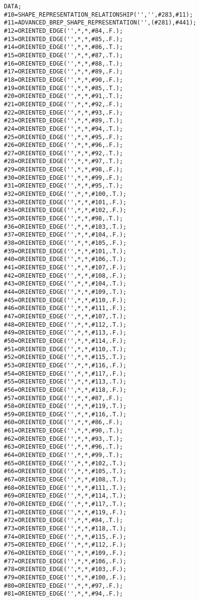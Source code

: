 \documentclass[a4paper,12pt]{article}
\begin{document}
\begin{lstlising}[language=C++]
\begin{lstlisting}[language=STEP]
DATA;
#10=SHAPE_REPRESENTATION_RELATIONSHIP('','',#283,#11);
#11=ADVANCED_BREP_SHAPE_REPRESENTATION('',(#281),#441);
#12=ORIENTED_EDGE('',*,*,#84,.F.);
#13=ORIENTED_EDGE('',*,*,#85,.F.);
#14=ORIENTED_EDGE('',*,*,#86,.T.);
#15=ORIENTED_EDGE('',*,*,#87,.T.);
#16=ORIENTED_EDGE('',*,*,#88,.T.);
#17=ORIENTED_EDGE('',*,*,#89,.F.);
#18=ORIENTED_EDGE('',*,*,#90,.F.);
#19=ORIENTED_EDGE('',*,*,#85,.T.);
#20=ORIENTED_EDGE('',*,*,#91,.T.);
#21=ORIENTED_EDGE('',*,*,#92,.F.);
#22=ORIENTED_EDGE('',*,*,#93,.F.);
#23=ORIENTED_EDGE('',*,*,#89,.T.);
#24=ORIENTED_EDGE('',*,*,#94,.T.);
#25=ORIENTED_EDGE('',*,*,#95,.F.);
#26=ORIENTED_EDGE('',*,*,#96,.F.);
#27=ORIENTED_EDGE('',*,*,#92,.T.);
#28=ORIENTED_EDGE('',*,*,#97,.T.);
#29=ORIENTED_EDGE('',*,*,#98,.F.);
#30=ORIENTED_EDGE('',*,*,#99,.F.);
#31=ORIENTED_EDGE('',*,*,#95,.T.);
#32=ORIENTED_EDGE('',*,*,#100,.T.);
#33=ORIENTED_EDGE('',*,*,#101,.F.);
#34=ORIENTED_EDGE('',*,*,#102,.F.);
#35=ORIENTED_EDGE('',*,*,#98,.T.);
#36=ORIENTED_EDGE('',*,*,#103,.T.);
#37=ORIENTED_EDGE('',*,*,#104,.F.);
#38=ORIENTED_EDGE('',*,*,#105,.F.);
#39=ORIENTED_EDGE('',*,*,#101,.T.);
#40=ORIENTED_EDGE('',*,*,#106,.T.);
#41=ORIENTED_EDGE('',*,*,#107,.F.);
#42=ORIENTED_EDGE('',*,*,#108,.F.);
#43=ORIENTED_EDGE('',*,*,#104,.T.);
#44=ORIENTED_EDGE('',*,*,#109,.T.);
#45=ORIENTED_EDGE('',*,*,#110,.F.);
#46=ORIENTED_EDGE('',*,*,#111,.F.);
#47=ORIENTED_EDGE('',*,*,#107,.T.);
#48=ORIENTED_EDGE('',*,*,#112,.T.);
#49=ORIENTED_EDGE('',*,*,#113,.F.);
#50=ORIENTED_EDGE('',*,*,#114,.F.);
#51=ORIENTED_EDGE('',*,*,#110,.T.);
#52=ORIENTED_EDGE('',*,*,#115,.T.);
#53=ORIENTED_EDGE('',*,*,#116,.F.);
#54=ORIENTED_EDGE('',*,*,#117,.F.);
#55=ORIENTED_EDGE('',*,*,#113,.T.);
#56=ORIENTED_EDGE('',*,*,#118,.F.);
#57=ORIENTED_EDGE('',*,*,#87,.F.);
#58=ORIENTED_EDGE('',*,*,#119,.T.);
#59=ORIENTED_EDGE('',*,*,#116,.T.);
#60=ORIENTED_EDGE('',*,*,#86,.F.);
#61=ORIENTED_EDGE('',*,*,#90,.T.);
#62=ORIENTED_EDGE('',*,*,#93,.T.);
#63=ORIENTED_EDGE('',*,*,#96,.T.);
#64=ORIENTED_EDGE('',*,*,#99,.T.);
#65=ORIENTED_EDGE('',*,*,#102,.T.);
#66=ORIENTED_EDGE('',*,*,#105,.T.);
#67=ORIENTED_EDGE('',*,*,#108,.T.);
#68=ORIENTED_EDGE('',*,*,#111,.T.);
#69=ORIENTED_EDGE('',*,*,#114,.T.);
#70=ORIENTED_EDGE('',*,*,#117,.T.);
#71=ORIENTED_EDGE('',*,*,#119,.F.);
#72=ORIENTED_EDGE('',*,*,#84,.T.);
#73=ORIENTED_EDGE('',*,*,#118,.T.);
#74=ORIENTED_EDGE('',*,*,#115,.F.);
#75=ORIENTED_EDGE('',*,*,#112,.F.);
#76=ORIENTED_EDGE('',*,*,#109,.F.);
#77=ORIENTED_EDGE('',*,*,#106,.F.);
#78=ORIENTED_EDGE('',*,*,#103,.F.);
#79=ORIENTED_EDGE('',*,*,#100,.F.);
#80=ORIENTED_EDGE('',*,*,#97,.F.);
#81=ORIENTED_EDGE('',*,*,#94,.F.);

\end{lstlisting}
\end{lstlising}
\end{document}
